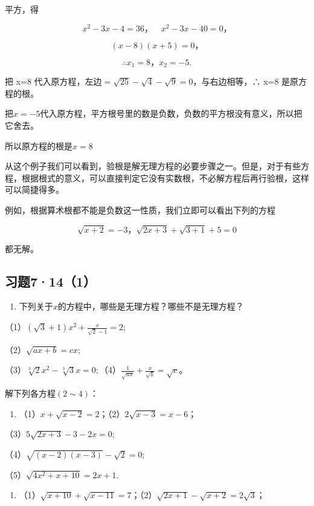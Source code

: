 平方，得

\[
x ^ {2} - 3 x - 4 = 36\text{，} \quad x ^ {2} - 3 x - 40 = 0\text{，}
\]

\[
(x - 8) (x + 5) = 0\text{，}
\]

\[
\therefore x _ {1} = 8\text{，} x _ {2} = - 5.
\]

 把 x=8
代入原方程，左边\(= \sqrt{25} -\sqrt{4} -\sqrt{9} = 0\)，与右边相等，∴
x=8 是原方程的根。

把\(x = -5\)代入原方程，平方根号里的数是负数，负数的平方根没有意义，所以把它舍去。

所以原方程的根是\(x = 8\)

从这个例子我们可以看到，验根是解无理方程的必要步骤之一。但是，对于有些方程，根据根式的意义，可以直接判定它没有实数根，不必解方程后再行验根，这样可以简捷得多。

例如，根据算术根都不能是负数这一性质，我们立即可以看出下列的方程

\[
\sqrt {x + 2} = - 3\text{，} \sqrt {2 x + 3} + \sqrt {3 + 1} + 5 = 0
\]

都无解。

\subsection{习题7·14（1）}

\begin{enumerate}
\item
  下列关于\(x\)的方程中，哪些是无理方程？哪些不是无理方程？
\end{enumerate}

（1）\((\sqrt{3} + 1)x^2 + \frac{x}{\sqrt{2} - 1} = 2;\)

（2）\(\sqrt{ax + b} = cx;\)

（3）\(\sqrt[3]{2} x^{2} - \sqrt[3]{3} x = 0;\)（4）\(\frac{1}{\sqrt{ax}} + \frac{x}{\sqrt{b}} = \sqrt{c}\)。

解下列各方程\((2\sim4)\)：

\begin{enumerate}[start=2]
\item
  （1）\(x + \sqrt{x - 2} = 2\)；（2）\(2\sqrt{x - 3} = x - 6\)；
\end{enumerate}

（3）\(5\sqrt{2x + 3} - 3 - 2x = 0;\)

（4）\(\sqrt{(x - 2)(x - 3)} - \sqrt{2} = 0;\)

（5）\(\sqrt{4x^2 + x + 10} = 2x + 1.\)

\begin{enumerate}[start=3]
\item
  （1）\(\sqrt{x + 10} + \sqrt{x - 11} = 7\)；（2）\(\sqrt{2x + 1} - \sqrt{x + 2} = 2\sqrt{3}\)；
\end{enumerate}

